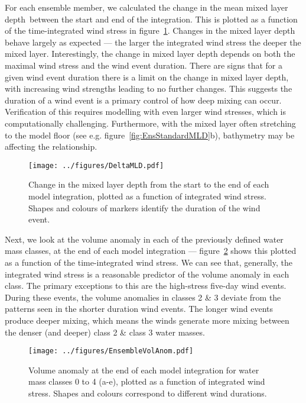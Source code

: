 For each ensemble member, we calculated the change in the mean mixed layer depth\footnotemark\ between the start and end of the integration. This is plotted as a function of the time-integrated wind stress in figure~\ref{fig:DeltaMLD}. Changes in the mixed layer depth behave largely as expected --- the larger the integrated wind stress the deeper the mixed layer. Interestingly, the change in mixed layer depth depends on both the maximal wind stress and the wind event duration. There are signs that for a given wind event duration there is a limit on the change in mixed layer depth, with increasing wind strengths leading to no further changes. This suggests the duration of a wind event is a primary control of how deep mixing can occur. Verification of this requires modelling with even larger wind stresses, which is computationally challenging. Furthermore, with the mixed layer often stretching to the model floor (see e.g. figure~\ref{fig:EnsStandardMLD}b), bathymetry may be affecting the relationship.

\begin{figure} 
    \centering
    \texttt{[image: ../figures/DeltaMLD.pdf]}
    \caption{Change in the mixed layer depth from the start to the end of each model integration, plotted as a function of integrated wind stress. Shapes and colours of markers identify the duration of the wind event.}
    \label{fig:DeltaMLD}
\end{figure}

Next, we look at the volume anomaly in each of the previously defined water mass classes, at the end of each model integration --- figure~\ref{fig:EnsVolAnom} shows this plotted as a function of the time-integrated wind stress. We can see that, generally, the integrated wind stress is a reasonable predictor of the volume anomaly in each class. The primary exceptions to this are the high-stress five-day wind events. During these events, the volume anomalies in classes 2 \& 3 deviate from the patterns seen in the shorter duration wind events. The longer wind events produce deeper mixing, which means the winds generate more mixing between the denser (and deeper) class 2 \& class 3 water masses.

\begin{figure} 
    \centering
    \texttt{[image: ../figures/EnsembleVolAnom.pdf]}
    \caption{Volume anomaly at the end of each model integration for water mass classes 0 to 4 (a-e), plotted as a function of integrated wind stress. Shapes and colours correspond to different wind durations.}
    \label{fig:EnsVolAnom}
\end{figure}

